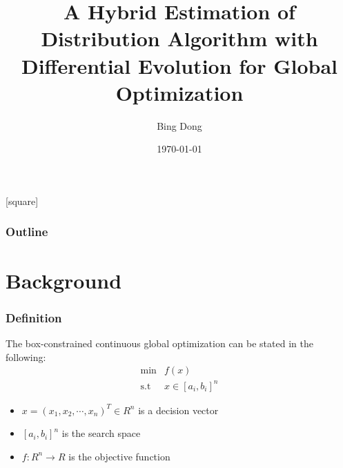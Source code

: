 \documentclass[xcolor=dvipsnames]{beamer}
\begin{document}
    \title[SSCI]{A Hybrid Estimation of Distribution Algorithm with Differential Evolution for Global Optimization}
    \author{Bing Dong}
    \date{\today}
    \begin{frame}
        \titlepage
    \end{frame}
    [square]
    \begin{frame}
        \frametitle{Outline}
        \tableofcontents
    \end{frame}

    \section{Background}
    \begin{frame}
    \frametitle{Definition}
    The box-constrained continuous global optimization can be stated in the following:
    \begin{equation}
    \begin{array}{rl}
    \mbox{min} & f(x)\\
    \mbox{s.t} & x\in[a_i,b_i]^n
    \end{array}
    \label{MOP}
    \end{equation}

    \begin{itemize}
    \item $x=(x_1, x_2, \cdots, x_n)^T\in{R^n}$ is a decision vector
    \item $[a_i, b_i]^n$ is the search space
    \item $f:R^n\to{R}$ is the objective function
    \end{itemize}
    \end{frame}
\end{document}
